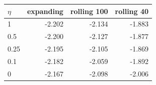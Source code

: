 \begin{tabular}{lrrr}
\toprule
$\eta$ & expanding & rolling 100 & rolling 40 \\
\midrule
1 & -2.202 & -2.134 & -1.883 \\
0.5 & -2.200 & -2.127 & -1.877 \\
0.25 & -2.195 & -2.105 & -1.869 \\
0.1 & -2.182 & -2.059 & -1.892 \\
0 & -2.167 & -2.098 & -2.006 \\
\bottomrule
\end{tabular}
